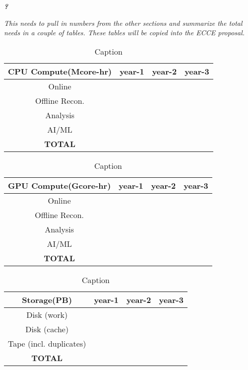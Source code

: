 
\textbf{\emph{?}}

\emph{This needs to pull in numbers from the other sections and summarize the total needs in a couple of tables. These tables will be copied into the ECCE proposal.}

\begin{table}[htb!]
    \centering
    \begin{tabular}{c|c|c|c}
        \hline
        CPU Compute(Mcore-hr) & year-1 & year-2 & year-3 \\
        \hline
        \hline
        Online   & & & \\
        \hline
        Offline Recon. & & & \\
        \hline
        Analysis  & & & \\
        \hline
        AI/ML    & & & \\
        \hline
        \textbf{TOTAL} & & & \\
        \hline
    \end{tabular}
    \caption{Caption}
    \label{tab:cpu_summary}
\end{table}


\begin{table}[htb!]
    \centering
    \begin{tabular}{c|c|c|c}
        \hline
        GPU Compute(Gcore-hr) & year-1 & year-2 & year-3 \\
        \hline
        \hline
        Online   & & & \\
        \hline
        Offline Recon. & & & \\
        \hline
        Analysis  & & & \\
        \hline
        AI/ML    & & & \\
        \hline
        \textbf{TOTAL} & & & \\
        \hline
    \end{tabular}
    \caption{Caption}
    \label{tab:gpu_summary}
\end{table}



\begin{table}[htb!]
    \centering
    \begin{tabular}{c|c|c|c}
        \hline
        Storage(PB) & year-1 & year-2 & year-3 \\
        \hline
        \hline
        Disk (work)    & & & \\
        \hline
        Disk (cache)    & & & \\
        \hline
        Tape (incl. duplicates)    & & & \\
        \hline
        \textbf{TOTAL} & & & \\
        \hline
    \end{tabular}
    \caption{Caption}
    \label{tab:storage_summary}
\end{table}
